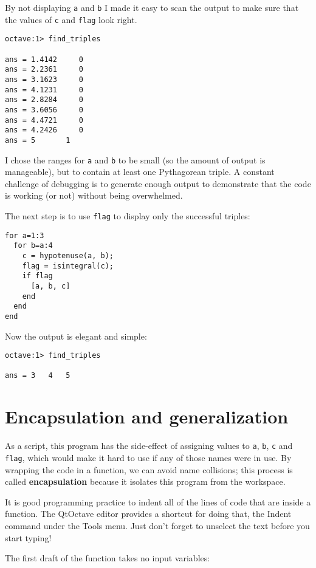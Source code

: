 By not displaying {\tt a} and {\tt b} I made it easy to scan the
output to make sure that the values of {\tt c} and {\tt flag}
look right.

\begin{verbatim}
octave:1> find_triples

ans = 1.4142     0
ans = 2.2361     0
ans = 3.1623     0
ans = 4.1231     0
ans = 2.8284     0
ans = 3.6056     0
ans = 4.4721     0
ans = 4.2426     0
ans = 5       1
\end{verbatim}

I chose the ranges for {\tt a} and {\tt b} to be small
(so the amount of output is manageable), but to contain at
least one Pythagorean triple. A constant challenge of debugging
is to generate enough output to demonstrate that the code is
working (or not) without being overwhelmed.

The next step is to use {\tt flag} to display only the successful
triples:

\begin{verbatim}
for a=1:3
  for b=a:4
    c = hypotenuse(a, b);
    flag = isintegral(c);
    if flag
      [a, b, c]
    end
  end
end
\end{verbatim}

Now the output is elegant and simple:

\begin{verbatim}
octave:1> find_triples

ans = 3   4   5
\end{verbatim}




\section{Encapsulation and generalization}

As a script, this program has the side-effect of assigning values to
{\tt a}, {\tt b}, {\tt c} and {\tt flag}, which would make it hard to
use if any of those names were in use. By wrapping the code in a
function, we can avoid name collisions; this process is called {\bf
encapsulation} because it isolates this program from the workspace.

It is good programming practice to indent all of the lines of code that are
inside a function. The QtOctave editor provides a
shortcut for doing that, the {\sf Indent} command
under the {\sf Tools} menu. Just don't forget to unselect the
text before you start typing!

The first draft of the function takes no input variables:

